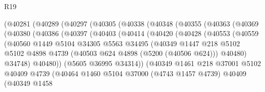 \begin{lexlean}{R19}
\begin{coremodule}
{{{{{{{{{{{              (@40281
                (@40289
                  (@40297
                    (@40305
                      (@40338
                        (@40348
                          (@40355
                            (@40363
                              (@40369
                                (@40380
                                  (@40386
                                    (@40397
                                      (@40403
                                        (@40414
                                          (@40420
                                            (@40428
                                              (@40553
                                                (@40559
                                                  (@40560
                                                    @1449
                                                    @5104
                                                    @34305
                                                    @5563
                                                    @34495
                                                    (@40349
                                                      @1447
                                                      @218
                                                      @5102
                                                      @5102
                                                      @4898
                                                      @4739
                                                      (@40503 @624 @4898 (@5200 (@40506 @624)))
                                                      @40480)
                                                    @34748)
                                                  @40480))
                                              (@5605 @36995 @34314))
                                            (@40349
                                              @1461
                                              @218
                                              @37001
                                              @5102
                                              @40409
                                              @4739
                                              (@40464
                                                @1460
                                                @5104
                                                @37000
                                                (@4743 @1457 @4739)
                                                @40409
                                                (@40349
                                                  @1458
}}}}}}}}}}}
\end{coremodule}
\end{lexlean}

